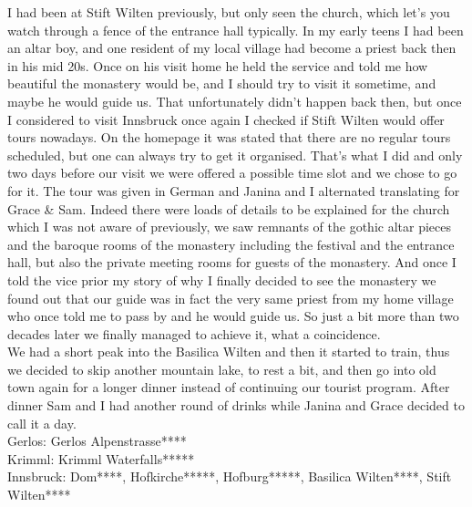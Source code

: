 {I had been at Stift Wilten previously, but only seen the church, which let's you watch through a fence of the entrance hall typically. In my early teens I had been an altar boy, and one resident of my local village had become a priest back then in his mid 20s. Once on his visit home he held the service and told me how beautiful the monastery would be, and I should try to visit it sometime, and maybe he would guide us. That unfortunately didn't happen back then, but once I considered to visit Innsbruck once again I checked if Stift Wilten would offer tours nowadays. On the homepage it was stated that there are no regular tours scheduled, but one can always try to get it organised. That's what I did and only two days before our visit we were offered a possible time slot and we chose to go for it. The tour was given in German and Janina and I alternated translating for Grace \& Sam. Indeed there were loads of details to be explained for the church which I was not aware of previously, we saw remnants of the gothic altar pieces and the baroque rooms of the monastery including the festival and the entrance hall, but also the private meeting rooms for guests of the monastery. And once I told the vice prior my story of why I finally decided to see the monastery we found out that our guide was in fact the very same priest from my home village who once told me to pass by and he would guide us. So just a bit more than two decades later we finally managed to achieve it, what a coincidence.\\
We had a short peak into the Basilica Wilten and then it started to train, thus we decided to skip another mountain lake, to rest a bit, and then go into old town again for a longer dinner instead of continuing our tourist program. After dinner Sam and I had another round of drinks while Janina and Grace decided to call it a day.\\

Gerlos: Gerlos Alpenstrasse****\\
Krimml: Krimml Waterfalls*****\\
Innsbruck: Dom****, Hofkirche*****, Hofburg*****, Basilica Wilten****, Stift Wilten****\\

}

